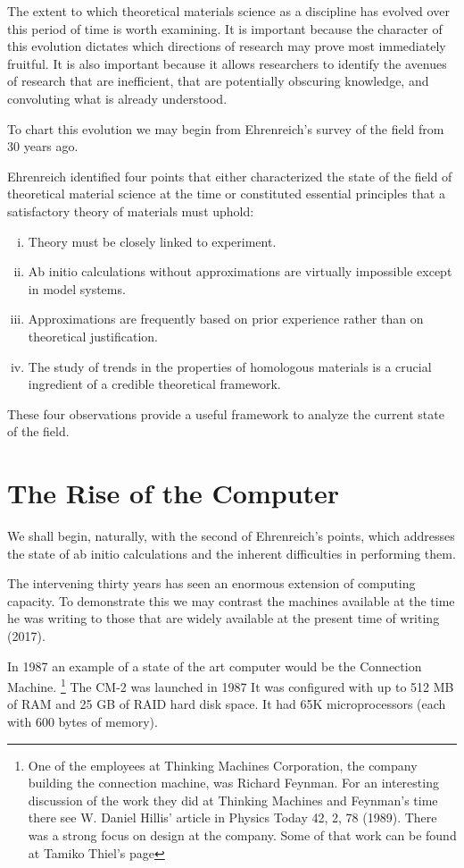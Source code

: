 The extent to which theoretical materials science as a discipline has evolved 
over this period of time is worth examining. 
It is important because the character of this evolution dictates which 
directions of research may prove most immediately fruitful. It is also important 
because it allows researchers to identify the avenues
of research that are inefficient, that are potentially obscuring knowledge, 
and convoluting what is already understood. 

To chart this evolution we may begin from Ehrenreich's survey of the field from 30 years ago.

Ehrenreich identified four points that either characterized the state 
of the field of theoretical material science at the time or constituted essential principles 
that a satisfactory theory of materials must uphold:
%
\begin{enumerate}[i)]
\item Theory must be closely linked to experiment.
\item Ab initio calculations without approximations are virtually impossible 
      except in model systems.
\item Approximations are frequently based on prior experience rather 
      than on theoretical justification.
\item The study of trends in the properties of homologous materials 
      is a crucial ingredient of a credible theoretical framework.
\end{enumerate}
%
These four observations provide a useful framework to analyze the current state of the field.

\section{The Rise of the Computer}
\label{sec:riseofcomp}
We shall begin, naturally, with the second of Ehrenreich's points, 
which addresses the state of ab initio calculations
and the inherent difficulties in performing them. 

The intervening thirty years has seen an enormous extension of computing capacity. 
To demonstrate this we may contrast the machines available at the time
he was writing to those that are widely available at the present time of writing (2017). 

In 1987 an example of a state of the art computer would be the Connection Machine.
\footnote{One of the employees at Thinking Machines Corporation,
the company building the connection machine, was Richard Feynman.
For an interesting discussion of the work they
did at Thinking Machines and Feynman's time there see W. Daniel
Hillis' article in Physics Today 42, 2, 78 (1989).
There was a strong focus on design at the company. Some of that
work can be found at Tamiko Thiel's page}%
The CM-2 was launched in 1987 It was configured with up to 512 MB of RAM and 25 GB of RAID
hard disk space. It had 65K microprocessors (each with 600 bytes of memory). 

